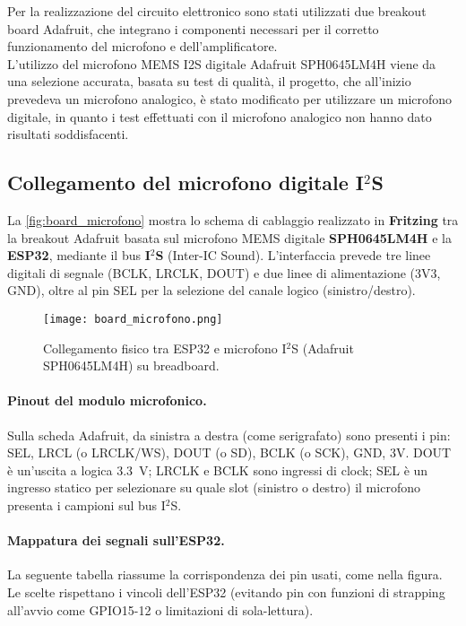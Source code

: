 Per la realizzazione del circuito elettronico sono stati utilizzati due breakout board Adafruit, che integrano i componenti necessari per il corretto funzionamento
  del microfono e dell'amplificatore.\\
  L'utilizzo del microfono MEMS I2S digitale Adafruit SPH0645LM4H viene da una selezione accurata, basata su test di qualità,
  il progetto, che all'inizio prevedeva un microfono analogico, è stato modificato per utilizzare un microfono digitale,
  in quanto i test effettuati con il microfono analogico non hanno dato risultati soddisfacenti.\\



  \subsection{Collegamento del microfono digitale I$^2$S}
  \label{subsec:conn_mic}
  
  La \autoref{fig:board_microfono} mostra lo schema di cablaggio realizzato in \textbf{Fritzing} tra la breakout Adafruit basata sul microfono MEMS digitale \textbf{SPH0645LM4H} e la \textbf{ESP32}, mediante il bus \textbf{I$^2$S} (Inter-IC Sound). L’interfaccia prevede tre linee digitali di segnale
  (BCLK, LRCLK, DOUT) e due linee di alimentazione (3V3, GND), oltre al pin SEL per la selezione del canale logico (sinistro/destro).
  
  \begin{figure}[H]
    \centering
    \texttt{[image: board\_microfono.png]}
    \caption{Collegamento fisico tra ESP32 e microfono I$^2$S (Adafruit SPH0645LM4H) su breadboard.}
    \label{fig:board_microfono}
  \end{figure} 

  \paragraph{Pinout del modulo microfonico.}
  Sulla scheda Adafruit, da sinistra a destra (come serigrafato) sono presenti i pin: SEL, LRCL (o LRCLK/WS), DOUT (o SD), BCLK (o SCK), GND, 3V.  
  DOUT è un’uscita a logica \SI{3.3}{\volt}; LRCLK e BCLK sono ingressi di clock; SEL è un ingresso statico per selezionare su quale slot (sinistro o destro) il microfono presenta i campioni sul bus I$^2$S.
  
  \paragraph{Mappatura dei segnali sull'ESP32.}
  La seguente tabella riassume la corrispondenza dei pin usati, come nella figura. Le scelte rispettano i vincoli dell'ESP32 (evitando pin con funzioni di strapping all'avvio come GPIO15-12 o limitazioni di sola-lettura).
  
